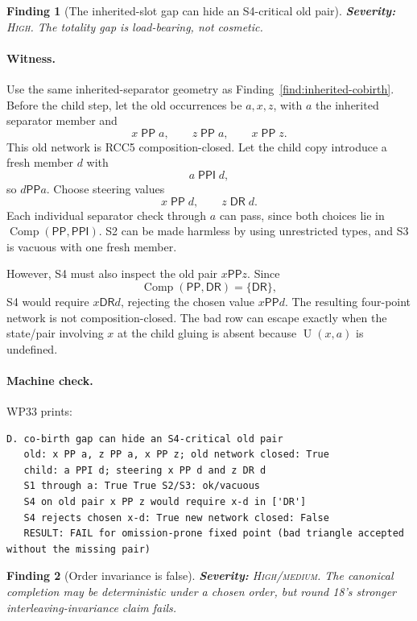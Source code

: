\documentclass[11pt]{article}
\newcommand{\PP}{\mathsf{PP}}
\newcommand{\PPI}{\mathsf{PPI}}
\newcommand{\DR}{\mathsf{DR}}
\newcommand{\Comp}{\operatorname{Comp}}
\newcommand{\Uop}{\operatorname{U}}
\newcommand{\sev}[1]{\textsc{#1}}
\newtheorem{finding}{Finding}
\theoremstyle{remark}
\begin{document}
\begin{finding}[The inherited-slot gap can hide an S4-critical old pair]
\label{find:s4-critical}
\textbf{Severity:} \sev{High}.  The totality gap is load-bearing, not cosmetic.
\end{finding}

\paragraph{Witness.}
Use the same inherited-separator geometry as Finding~\ref{find:inherited-cobirth}.  Before the child step, let the old occurrences be $a,x,z$, with $a$ the inherited separator member and
\[
  x\;\PP\;a,\qquad z\;\PP\;a,\qquad x\;\PP\;z.
\]
This old network is RCC5 composition-closed.  Let the child copy introduce a fresh member $d$ with
\[
  a\;\PPI\;d,
\]
so $d\PP a$.  Choose steering values
\[
  x\;\PP\;d,
  \qquad
  z\;\DR\;d.
\]
Each individual separator check through $a$ can pass, since both choices lie in $\Comp(\PP,\PPI)$.  S2 can be made harmless by using unrestricted types, and S3 is vacuous with one fresh member.

However, S4 must also inspect the old pair $x\PP z$.  Since
\[
  \Comp(\PP,\DR)=\{\DR\},
\]
S4 would require $x\DR d$, rejecting the chosen value $x\PP d$.  The resulting four-point network is not composition-closed.  The bad row can escape exactly when the state/pair involving $x$ at the child gluing is absent because $\Uop(x,a)$ is undefined.

\paragraph{Machine check.}
WP33 prints:
\begin{lstlisting}[style=reviewtext]
D. co-birth gap can hide an S4-critical old pair
   old: x PP a, z PP a, x PP z; old network closed: True
   child: a PPI d; steering x PP d and z DR d
   S1 through a: True True S2/S3: ok/vacuous
   S4 on old pair x PP z would require x-d in ['DR']
   S4 rejects chosen x-d: True new network closed: False
   RESULT: FAIL for omission-prone fixed point (bad triangle accepted without the missing pair)
\end{lstlisting}

\begin{finding}[Order invariance is false]
\label{find:order}
\textbf{Severity:} \sev{High/medium}.  The canonical completion may be deterministic under a chosen order, but round 18's stronger interleaving-invariance claim fails.
\end{finding}
\end{document}
